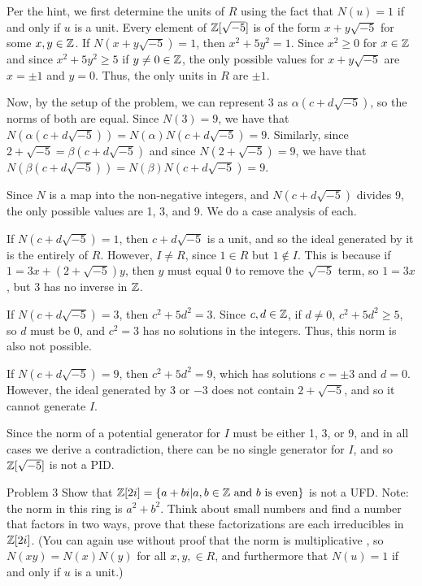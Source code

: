 \documentclass{hmwk}
\begin{document}
\begin{solution}


\pre Per the hint, we first determine the units of $R$ using the fact that $N(u) = 1$ if and only if $u$ is a unit. Every element of $\mathbb{Z}[\sqrt{-5}]$ is of the form $x + y\sqrt{-5}$ for some $x, y \in \mathbb{Z}$. If $N(x + y\sqrt{-5}) = 1$, then $x^2 + 5y^2 = 1$. Since $x^2 \geq 0$ for $x \in \mathbb{Z}$ and since $x^2 + 5y^2 \geq 5$ if $y \neq 0 \in \mathbb{Z}$, the only possible values for $x + y\sqrt{-5}$ are $x = \pm 1$ and $y = 0$. Thus, the only units in $R$ are $\pm 1$. 

\pre Now, by the setup of the problem,  we can represent $3$ as $\alpha(c + d\sqrt{-5})$, so the norms of both are equal. Since $N(3) = 9$, we have that $N(\alpha(c + d\sqrt{-5})) = N(\alpha)N(c+d\sqrt{-5}) = 9$. Similarly, since $2 + \sqrt{-5} = \beta(c + d\sqrt{-5})$ and since $N(2 + \sqrt{-5}) = 9$, we have that $N(\beta(c + d\sqrt{-5})) = N(\beta)N(c+d\sqrt{-5}) = 9$. 

\pre Since $N$ is a map into the non-negative integers, and $N(c+d\sqrt{-5})$ divides 9, the only possible values are 1, 3, and 9. We do a case analysis of each. 

\pre If $N(c+d\sqrt{-5}) = 1$, then $c + d\sqrt{-5}$ is a unit, and so the ideal generated by it is the entirely of $R$. However, $I \neq R$, since $1 \in R$ but $1 \notin I$. This is because if $1 = 3x + (2 + \sqrt{-5})y$, then $y$ must equal 0 to remove the $\sqrt{-5}$ term, so $1 = 3x$, but 3 has no inverse in $\mathbb{Z}$.

\pre If $N(c+d\sqrt{-5}) = 3$, then $c^2 + 5d^2 = 3$. Since $c, d \in \mathbb{Z}$, if $d \neq 0$, $c^2 + 5d^2 \geq 5$, so $d$ must be 0, and $c^2 = 3$ has no solutions in the integers. Thus, this norm is also not possible. 

\pre If $N(c+d\sqrt{-5}) = 9$, then $c^2 + 5d^2 = 9$, which has solutions $c = \pm 3$ and $d = 0$. However, the ideal generated by $3$ or $-3$ does not contain $2 + \sqrt{-5}$, and so it cannot generate $I$.

\pre Since the norm of a potential generator for $I$ must be either 1, 3, or 9, and in all cases we derive a contradiction, there can be no single generator for $I$, and so $\mathbb{Z}[\sqrt{-5}]$ is not a PID. 
\end{solution}

\begin{problem}{Problem 3}
Show that $\mathbb{Z}[2i] = \{ a+bi | a, b\in \mathbb{Z} \text{ and $b$ is even} \}$ is not a UFD.  Note: the norm in this ring is $a^2 + b^2$. Think about small numbers and find a number that factors in two ways, prove that these factorizations are each irreducibles in $\mathbb{Z}[2i]$. (You can again use without proof that the norm is multiplicative , so $N(xy) = N(x)N(y)$ for all $x, y, \in R$, and furthermore that $N(u) = 1$ if and only if $u$ is a unit.)
\end{problem}
\end{document}
